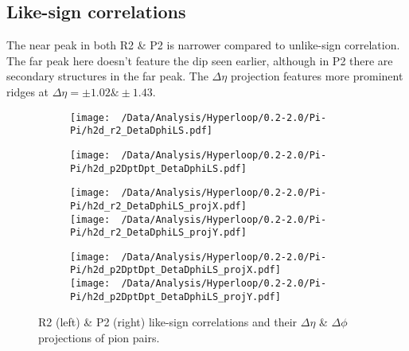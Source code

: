 \documentclass[12pt,a4paper,twoside]{report}
\begin{document}
\subsection{Like-sign correlations}
The near peak in both R2 \& P2 is narrower compared to unlike-sign correlation. The far peak here doesn't feature the dip seen earlier, although in P2 there are secondary structures in the far peak. The $\Delta\eta$ projection features more prominent ridges at $\Delta\eta=\pm1.02\&\pm1.43$.
\begin{figure}[H]
	\begin{subfigure}{0.49\linewidth}
		\texttt{[image: ~/Data/Analysis/Hyperloop/0.2-2.0/Pi-Pi/h2d\_r2\_DetaDphiLS.pdf]}\\
	\end{subfigure}
	\begin{subfigure}{0.49\linewidth}
		\texttt{[image: ~/Data/Analysis/Hyperloop/0.2-2.0/Pi-Pi/h2d\_p2DptDpt\_DetaDphiLS.pdf]}\\
	\end{subfigure}
\end{figure}
\begin{figure}[H]
	\ContinuedFloat
	\begin{subfigure}{0.49\linewidth}
		\texttt{[image: ~/Data/Analysis/Hyperloop/0.2-2.0/Pi-Pi/h2d\_r2\_DetaDphiLS\_projX.pdf]}\\
		\texttt{[image: ~/Data/Analysis/Hyperloop/0.2-2.0/Pi-Pi/h2d\_r2\_DetaDphiLS\_projY.pdf]}
	\end{subfigure}
	\begin{subfigure}{0.49\linewidth}
		\texttt{[image: ~/Data/Analysis/Hyperloop/0.2-2.0/Pi-Pi/h2d\_p2DptDpt\_DetaDphiLS\_projX.pdf]}\\
		\texttt{[image: ~/Data/Analysis/Hyperloop/0.2-2.0/Pi-Pi/h2d\_p2DptDpt\_DetaDphiLS\_projY.pdf]}
	\end{subfigure}
	\caption{R2 (left) \& P2 (right) like-sign correlations and their $\Delta\eta$ \& $\Delta\phi$ projections of pion pairs.}
\end{figure}
\end{document}
